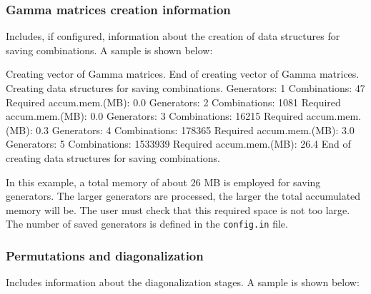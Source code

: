 \documentclass[]{article}
\newenvironment{Shaded}{}{}
\newcommand{\BuiltInTok}[1]{#1}
\newcommand{\ExtensionTok}[1]{#1}
\newcommand{\NormalTok}[1]{#1}
\begin{document}
\hypertarget{gamma-matrices-creation-information}{%
\subsubsection{Gamma matrices creation
information}\label{gamma-matrices-creation-information}}

Includes, if configured, information about the creation of data
structures for saving combinations. A sample is shown below:

\begin{Shaded}
\begin{Highlighting}[]
\ExtensionTok{Creating}\NormalTok{ vector of Gamma matrices.}
\ExtensionTok{End}\NormalTok{ of creating vector of Gamma matrices.}
\ExtensionTok{Creating}\NormalTok{ data structures for saving combinations.}
\ExtensionTok{Generators}\NormalTok{:  1  Combinations:         47  Required accum.mem.(MB)}\BuiltInTok{:}\NormalTok{ 0.0}
\ExtensionTok{Generators}\NormalTok{:  2  Combinations:       1081  Required accum.mem.(MB)}\BuiltInTok{:}\NormalTok{ 0.0}
\ExtensionTok{Generators}\NormalTok{:  3  Combinations:      16215  Required accum.mem.(MB)}\BuiltInTok{:}\NormalTok{ 0.3}
\ExtensionTok{Generators}\NormalTok{:  4  Combinations:     178365  Required accum.mem.(MB)}\BuiltInTok{:}\NormalTok{ 3.0}
\ExtensionTok{Generators}\NormalTok{:  5  Combinations:    1533939  Required accum.mem.(MB)}\BuiltInTok{:}\NormalTok{ 26.4}
\ExtensionTok{End}\NormalTok{ of creating data structures for saving combinations.}
\end{Highlighting}
\end{Shaded}

In this example, a total memory of about 26 MB is employed for saving
generators. The larger generators are processed, the larger the total
accumulated memory will be. The user must check that this required space
is not too large. The number of saved generators is defined in the
\texttt{config.in} file.

\hypertarget{permutations-and-diagonalization}{%
\subsubsection{Permutations and
diagonalization}\label{permutations-and-diagonalization}}

Includes information about the diagonalization stages. A sample is shown
below:
\end{document}
